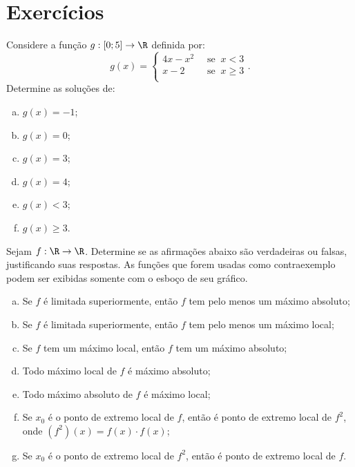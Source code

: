 \section{Exercícios}

\begin{exercise}
  Considere a função $g: [0 ; 5] \to \R$ definida por: $$g(x) =
                                \begin{cases}
                                4x-x^2 & \ \text{ se } \ x< 3 \\
                                x-2 & \ \text{ se } \  x \geq 3 \\
                                \end{cases}.$$
Determine as soluções de:
\begin{enumerate}[(a)]
  \item $g(x) = -1$;
  \item $g(x) = 0$;
  \item $g(x) = 3$;
  \item $g(x) = 4$;
  \item $g(x) < 3$;
  \item $g(x) \geq 3$.
\end{enumerate}
\end{exercise}

\begin{exercise}
Sejam $f: \R \to \R $. Determine se as afirmações abaixo são
verdadeiras ou falsas, justificando suas respostas. As funções que
forem usadas como contraexemplo podem ser exibidas somente com o
esboço de seu gráfico.
\begin{enumerate}[(a)]
  \item Se $f$ é limitada superiormente, então $f$ tem pelo menos um máximo absoluto;
  \item Se $f$ é limitada superiormente, então $f$ tem pelo menos um máximo local;
  \item Se $f$ tem um máximo local, então $f$ tem um máximo absoluto;
  \item Todo máximo local de $f$ é máximo absoluto;
  \item Todo máximo absoluto de $f$ é máximo local;
  \item Se $x_0$ é o ponto de extremo local de $f$, então é ponto de
  extremo local de $f^2$, onde $(f^2)(x) = f(x) \cdot f(x)$;
  \item Se $x_0$ é o ponto de extremo local de $f^2$, então é ponto de
  extremo local de $f$.
\end{enumerate}
\end{exercise}

